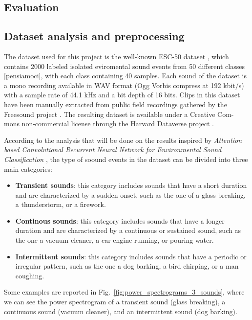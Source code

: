 \documentclass{article}
\begin{document}
\begin{sloppy}
\section{Evaluation}
\label{sec:evaluation}

\subsection{Dataset analysis and preprocessing}
\label{sec:format}

The dataset used for this project is the well-known ESC-50 dataset \cite{piczak2015dataset}, which contains
2000 labeled isolated eviromental sound events from 50 different classes [pensiamoci], with each class containing 40 samples.
Each sound of the dataset is a mono recording available in WAV format (Ogg Vorbis
compress at 192 kbit/s) with a sample rate of 44.1 kHz and a bit depth of 16 bits.
Clips in this dataset have been manually extracted from public field recordings gathered
by the Freesound project \cite{fonseca2020fsd50k}. The resulting dataset is available under a Creative Com-
mons non-commercial license through the Harvard Dataverse project \cite{piczak2015dataset}.

According to the analysis that will be done on the results inspired by \textit{Attention based Convolutional Recurrent Neural Network for Environmental Sound Classification} \cite{zhang2019attentionbasedconvolutionalrecurrent}, the type of soound events in the dataset can be divided into three main categories:
\begin{itemize}
    \item \textbf{Transient sounds}: this category includes sounds that have a short duration and are characterized by a sudden onset, such as the one of a glass breaking, a thunderstorm, or a firework.
    \item \textbf{Continous sounds}: this category includes sounds that have a longer duration and are characterized by a continuous or sustained sound, such as the one a vacuum cleaner, a car engine running, or pouring water.
    \item \textbf{Intermittent sounds}: this category includes sounds that have a periodic or irregular pattern, such as the one a dog barking, a bird chirping, or a man coughing.
\end{itemize}
Some examples are reported in Fig.~\ref{fig:power_spectrograms_3_sounds}, where we can see the power spectrogram of a transient sound (glass breaking), a continuous sound (vacuum cleaner), and an intermittent sound (dog barking).


\end{sloppy}
\end{document}
